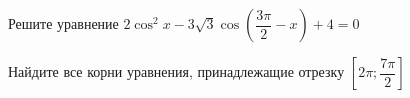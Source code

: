 \begin{ex}
	\begin{condition}
		\begin{enumcols}[label=\asbuk*)]
			\item Решите уравнение \( 2\cos^2 x - 3\sqrt{3}\cos{\left(\dfrac{3\pi}{2}-x\right)}  + 4= 0 \)
			\item Найдите все корни уравнения, принадлежащие отрезку \( \left[2\pi;\dfrac{7\pi}{2}\right] \)
		\end{enumcols}
	\end{condition}
\end{ex}